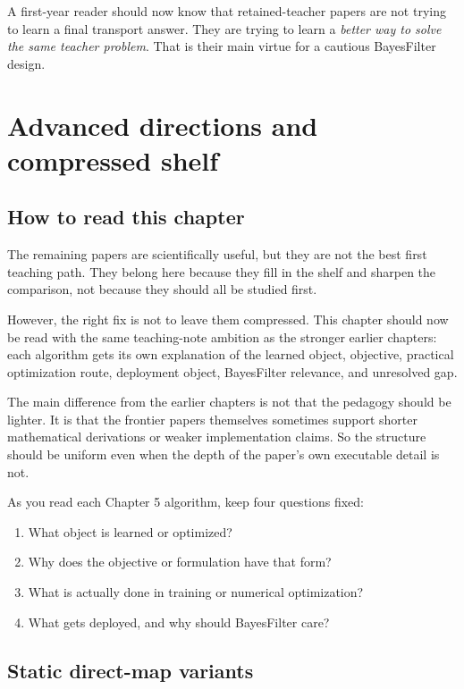 \documentclass[11pt]{report}
\begin{document}
A first-year reader should now know that retained-teacher papers are not trying to
learn a final transport answer.  They are trying to learn a \emph{better way to
solve the same teacher problem}.  That is their main virtue for a cautious
BayesFilter design.


\chapter{Advanced directions and compressed shelf}

\section{How to read this chapter}

The remaining papers are scientifically useful, but they are not the best first
teaching path.  They belong here because they fill in the shelf and sharpen the
comparison, not because they should all be studied first.

However, the right fix is not to leave them compressed.  This chapter should now be
read with the same teaching-note ambition as the stronger earlier chapters: each
algorithm gets its own explanation of the learned object, objective, practical
optimization route, deployment object, BayesFilter relevance, and unresolved gap.

The main difference from the earlier chapters is not that the pedagogy should be
lighter.  It is that the frontier papers themselves sometimes support shorter
mathematical derivations or weaker implementation claims.  So the structure should
be uniform even when the depth of the paper's own executable detail is not.

As you read each Chapter 5 algorithm, keep four questions fixed:
\begin{enumerate}[label=(\roman*)]
  \item What object is learned or optimized?
  \item Why does the objective or formulation have that form?
  \item What is actually done in training or numerical optimization?
  \item What gets deployed, and why should BayesFilter care?
\end{enumerate}
\section{Static direct-map variants}
\end{document}
